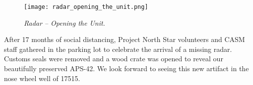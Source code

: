  \begin{figure}[H]
    \vspace{2em}
    \centering
    \texttt{[image: radar\_opening\_the\_unit.png]}
    \caption*{\small \em Radar -- Opening the Unit.}
    \label{fig:img3}
 \end{figure}

After 17 months of social distancing, Project North Star volunteers and CASM staff gathered in the parking lot to celebrate the arrival of a missing radar. Customs seals were removed and a wood crate was opened to reveal our beautifully preserved APS-42. We look forward to seeing this new artifact in the nose wheel well of 17515.




 





